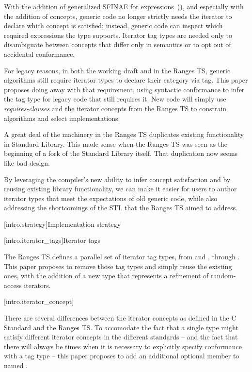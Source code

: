 \pnum
With the addition of generalized SFINAE for expressions~(\cite{expr-sfinae}),
and especially with the addition of concepts, generic code no longer strictly
needs the iterator to declare which concept is satisfied; instead, generic
code can inspect which required expressions the type supports. Iterator tag types
are needed only to disambiguate between concepts that differ only in semantics
or to opt out of accidental conformance.

\pnum
For legacy reasons, in both the working draft and in the Ranges TS, generic
algorithms still require iterator types to declare their category via tag. This
paper proposes doing away with that requirement, using syntactic conformance to
infer the tag type for legacy code that still requires it. New code will simply
use \textit{requires-clauses} and the iterator concepts from the Ranges TS to
constrain algorithms and select implementations.

\pnum
A great deal of the machinery in the Ranges TS duplicates existing functionality
in Standard Library. This made sense when the Ranges TS was seen as the
beginning of a fork of the Standard Library itself. That duplication now seems
like bad design.

\pnum
By leveraging the compiler's new ability to infer concept satisfaction and by
reusing existing library functionality, we can make it easier for users to author
iterator types that meet the expectations of old generic code, while also
addressing the shortcomings of the STL that the Ranges TS aimed to address.

[intro.strategy]{Implementation strategy}

[intro.iterator_tags]{Iterator tags}

\pnum
The Ranges TS defines a parallel set of iterator tag types, from
 and , through
. This paper proposes to remove those
tag types and simply reuse the existing ones, with the addition of a new
 type that represents a refinement of
random-access iterators.

[intro.iterator_concept]{}

\pnum
There are several differences between the iterator concepts as defined in the
C\Rplus\Rplus\xspace Standard and the Ranges TS. To accomodate the
fact that a single type might satisfy different iterator concepts in the
different standards -- and the fact that there will always be times when it is
necessary to explicitly specify conformance with a tag type -- this paper
proposes to add an additional optional member to 
named .

